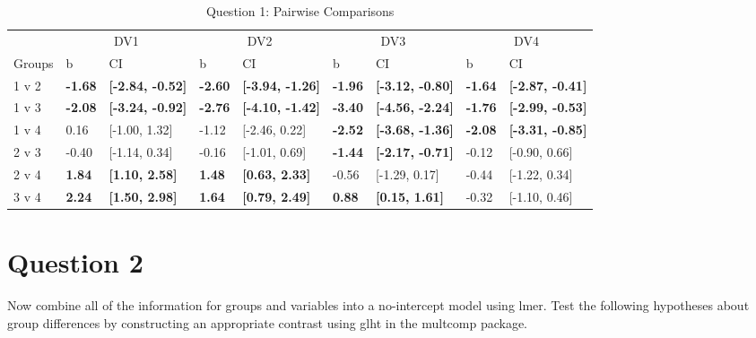 \documentclass{article}\usepackage[]{graphicx}\usepackage[]{color}
\newenvironment{knitrout}{}{} %
\begin{document}
\begin{knitrout}
\begin{table}
\caption{\label{tab:unnamed-chunk-5}Question 1: Pairwise Comparisons}
\centering
\begin{tabular}[t]{lllllllll}
\toprule
\multicolumn{1}{c}{ } & \multicolumn{2}{c}{DV1} & \multicolumn{2}{c}{DV2} & \multicolumn{2}{c}{DV3} & \multicolumn{2}{c}{DV4} \\
\cmidrule(l{2pt}r{2pt}){2-3} \cmidrule(l{2pt}r{2pt}){4-5} \cmidrule(l{2pt}r{2pt}){6-7} \cmidrule(l{2pt}r{2pt}){8-9}
Groups & b & CI & b & CI & b & CI & b & CI\\
\midrule
1 v 2 & \textbf{-1.68} & \textbf{[-2.84, -0.52]} & \textbf{-2.60} & \textbf{[-3.94, -1.26]} & \textbf{-1.96} & \textbf{[-3.12, -0.80]} & \textbf{-1.64} & \textbf{[-2.87, -0.41]}\\
1 v 3 & \textbf{-2.08} & \textbf{[-3.24, -0.92]} & \textbf{-2.76} & \textbf{[-4.10, -1.42]} & \textbf{-3.40} & \textbf{[-4.56, -2.24]} & \textbf{-1.76} & \textbf{[-2.99, -0.53]}\\
1 v 4 & 0.16 & [-1.00, 1.32] & -1.12 & [-2.46, 0.22] & \textbf{-2.52} & \textbf{[-3.68, -1.36]} & \textbf{-2.08} & \textbf{[-3.31, -0.85]}\\
2 v 3 & -0.40 & [-1.14, 0.34] & -0.16 & [-1.01, 0.69] & \textbf{-1.44} & \textbf{[-2.17, -0.71]} & -0.12 & [-0.90, 0.66]\\
2 v 4 & \textbf{1.84} & \textbf{[1.10, 2.58]} & \textbf{1.48} & \textbf{[0.63, 2.33]} & -0.56 & [-1.29, 0.17] & -0.44 & [-1.22, 0.34]\\
3 v 4 & \textbf{2.24} & \textbf{[1.50, 2.98]} & \textbf{1.64} & \textbf{[0.79, 2.49]} & \textbf{0.88} & \textbf{[0.15, 1.61]} & -0.32 & [-1.10, 0.46]\\
\bottomrule
\end{tabular}
\end{table}


\end{knitrout}



\section{Question 2}
Now combine all of the information for groups and variables into a no-intercept model using lmer\( \). Test the following hypotheses about group differences by constructing an appropriate contrast using glht\( \) in the multcomp package. \\
\end{document}
